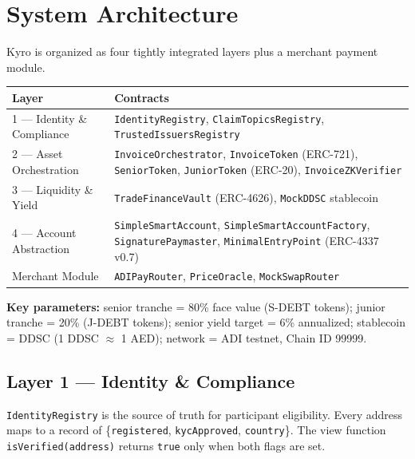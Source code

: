 \documentclass[11pt,a4paper]{article}
\begin{document}
\section{System Architecture}

Kyro is organized as four tightly integrated layers plus a merchant payment module.

\begin{table}[H]
\centering\small
\begin{tabularx}{\textwidth}{lX}
\toprule
\textbf{Layer} & \textbf{Contracts} \\
\midrule
1 — Identity \& Compliance  & \texttt{IdentityRegistry}, \texttt{ClaimTopicsRegistry}, \texttt{TrustedIssuersRegistry} \\
2 — Asset Orchestration     & \texttt{InvoiceOrchestrator}, \texttt{InvoiceToken} (ERC-721), \texttt{SeniorToken}, \texttt{JuniorToken} (ERC-20), \texttt{InvoiceZKVerifier} \\
3 — Liquidity \& Yield      & \texttt{TradeFinanceVault} (ERC-4626), \texttt{MockDDSC} stablecoin \\
4 — Account Abstraction     & \texttt{SimpleSmartAccount}, \texttt{SimpleSmartAccountFactory}, \texttt{SignaturePaymaster}, \texttt{MinimalEntryPoint} (ERC-4337 v0.7) \\
Merchant Module             & \texttt{ADIPayRouter}, \texttt{PriceOracle}, \texttt{MockSwapRouter} \\
\bottomrule
\end{tabularx}
\end{table}

\vspace{-2pt}
\noindent\textbf{Key parameters:} senior tranche = 80\% face value (S-DEBT tokens); junior
tranche = 20\% (J-DEBT tokens); senior yield target = 6\% annualized; stablecoin = DDSC
(1 DDSC $\approx$ 1 AED); network = ADI testnet, Chain ID 99999.

\subsection{Layer 1 — Identity \& Compliance}

\texttt{IdentityRegistry} is the source of truth for participant eligibility. Every address
maps to a record of \{\texttt{registered}, \texttt{kycApproved}, \texttt{country}\}. The view
function \texttt{isVerified(address)} returns \texttt{true} only when both flags are set.
\end{document}

